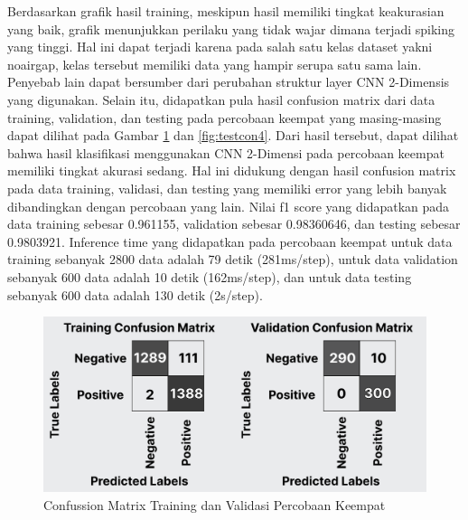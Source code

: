 Berdasarkan grafik hasil training, meskipun hasil memiliki tingkat keakurasian yang baik, grafik menunjukkan perilaku yang tidak wajar dimana terjadi spiking yang tinggi. Hal ini dapat terjadi karena pada salah satu kelas dataset yakni noairgap, kelas tersebut memiliki data yang hampir serupa satu sama lain. Penyebab lain dapat bersumber dari perubahan struktur layer CNN 2-Dimensis yang digunakan. Selain itu, didapatkan pula hasil confusion matrix dari data training, validation, dan testing pada percobaan keempat yang masing-masing dapat dilihat pada Gambar \ref{fig:tvcon4} dan \ref{fig:testcon4}. Dari hasil tersebut, dapat dilihat bahwa hasil klasifikasi menggunakan CNN 2-Dimensi pada percobaan keempat memiliki tingkat akurasi sedang. Hal ini didukung dengan hasil confusion matrix pada data training, validasi, dan testing yang memiliki error yang lebih banyak dibandingkan dengan percobaan yang lain. Nilai f1 score yang didapatkan pada data training sebesar 0.961155, validation sebesar 0.98360646, dan testing sebesar 0.9803921. Inference time yang didapatkan pada percobaan keempat untuk data training sebanyak 2800 data adalah 79 detik (281ms/step), untuk data validation sebanyak 600 data adalah 10 detik (162ms/step), dan untuk data testing sebanyak 600 data adalah 130 detik (2s/step).

\begin{figure} [H] \centering
    \includegraphics[scale=0.3]{gambar/bab4/tvcon4.png}
    \caption{Confussion Matrix Training dan Validasi Percobaan Keempat}
    \label{fig:tvcon4}
\end{figure}

